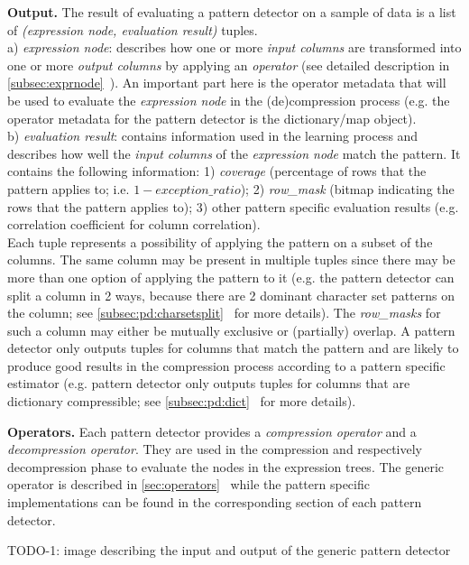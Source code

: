 \textbf{Output.} The result of evaluating a pattern detector on a sample of data is a list of \textit{(expression node, evaluation result)} tuples.\\
a) \textit{expression node}: describes how one or more \textit{input columns} are transformed into one or more \textit{output columns} by applying an \textit{operator} (see detailed description in \ref{subsec:exprnode}~). An important part here is the operator metadata that will be used to evaluate the \textit{expression node} in the (de)compression process (e.g. the operator metadata for the  pattern detector is the dictionary/map object).\\
b) \textit{evaluation result}: contains information used in the learning process and describes how well the \textit{input columns} of the \textit{expression node} match the pattern. It contains the following information: 1) \textit{coverage} (percentage of rows that the pattern applies to; i.e. \(1 - exception\_ratio\)); 2) \textit{row\_mask} (bitmap indicating the rows that the pattern applies to); 3) other pattern specific evaluation results (e.g. correlation coefficient for column correlation).\\
Each tuple represents a possibility of applying the pattern on a subset of the columns. The same column may be present in multiple tuples since there may be more than one option of applying the pattern to it (e.g. the  pattern detector can split a column in 2 ways, because there are 2 dominant character set patterns on the column; see \ref{subsec:pd:charsetsplit}~ for more details). The \textit{row\_masks} for such a column may either be mutually exclusive or (partially) overlap. A pattern detector only outputs tuples for columns that match the pattern and are likely to produce good results in the compression process according to a pattern specific estimator (e.g.  pattern detector only outputs tuples for columns that are dictionary compressible; see \ref{subsec:pd:dict}~ for more details).

\textbf{Operators.} Each pattern detector provides a \textit{compression operator} and a \textit{decompression operator}. They are used in the compression and respectively decompression phase to evaluate the nodes in the expression trees. The generic operator is described in \ref{sec:operators}~ while the pattern specific implementations can be found in the corresponding section of each pattern detector.

TODO-1: image describing the input and output of the generic pattern detector

